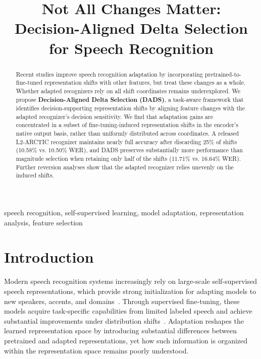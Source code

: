 \documentclass{article}
\title{Not All Changes Matter:\\Decision-Aligned Delta Selection for Speech Recognition}
\begin{document}
\ninept
\maketitle

\begin{abstract}
Recent studies improve speech recognition adaptation by incorporating pretrained-to-fine-tuned representation shifts with other features, but treat these changes as a whole. Whether adapted recognizers rely on all shift coordinates remains underexplored. We propose \textbf{Decision-Aligned Delta Selection (DADS)}, a task-aware framework that identifies decision-supporting representation shifts by aligning feature changes with the adapted recognizer's decision sensitivity. We find that adaptation gains are concentrated in a subset of fine-tuning-induced representation shifts in the encoder's native output basis, rather than uniformly distributed across coordinates. A released L2-ARCTIC recognizer maintains nearly full accuracy after discarding 25\% of shifts (10.58\% vs. 10.50\% WER), and DADS preserves substantially more performance than magnitude selection when retaining only half of the shifts (11.71\% vs. 16.64\% WER). Further reversion analyses show that the adapted recognizer relies unevenly on the induced shifts.
\end{abstract}

\begin{keywords}
speech recognition, self-supervised learning, model adaptation, representation analysis, feature selection
\end{keywords}

\section{Introduction}
\label{sec:intro}
Modern speech recognition systems increasingly rely on large-scale self-supervised speech representations, which provide strong initialization for adapting models to new speakers, accents, and domains~\cite{mohamed2022review,baevski2020wav2vec,hsu2021hubert,chen2022wavlm,baevski2022data2vec,yang2021superb}. Through supervised fine-tuning, these models acquire task-specific capabilities from limited labeled speech and achieve substantial improvements under distribution shifts~\cite{thai2026contrastive,hu2022lora,bagat2025maslora}. Adaptation reshapes the learned representation space by introducing substantial differences between pretrained and adapted representations, yet how such information is organized within the representation space remains poorly understood.
\end{document}
